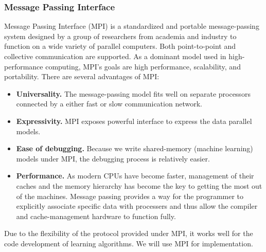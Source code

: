 \hspace{0.02in}
\subsubsection{Message Passing Interface}
Message Passing Interface (MPI) is a standardized and portable message-passing system designed by a group of researchers from academia and industry to function on a wide variety of parallel computers. Both point-to-point and collective communication are supported. As a dominant model used in high-performance computing, MPI's goals are high performance, scalability, and portability. There are several advantages of MPI:
\begin{itemize}
\item {\bf Universality.} The message-passing model fits well on separate processors connected by a either fast or slow communication network.
\item {\bf Expressivity.} MPI exposes powerful interface to express the data parallel models.
\item {\bf Ease of debugging.} Because we write shared-memory (machine learning) models under MPI, the debugging process is relatively easier.
\item {\bf Performance.} As modern CPUs have become faster, management of their caches and the memory hierarchy has become the key to getting the most out of the machines. Message passing provides a way for the programmer to explicitly associate specific data with processers and thus allow the compiler and cache-management hardware to function fully.
\end{itemize}
Due to the flexibility of the protocol provided under MPI, it works well for the code development of learning algorithms. We will use MPI for implementation.
